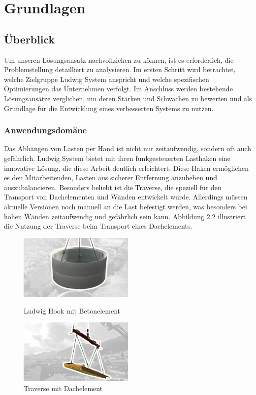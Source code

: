 \section{Grundlagen}

\subsection{Überblick}
Um unseren Lösungsansatz nachvollziehen zu können, ist es erforderlich, 
die Problemstellung detailliert zu analysieren. Im ersten Schritt wird betrachtet, 
welche Zielgruppe Ludwig System anspricht und welche spezifischen Optimierungen 
das Unternehmen verfolgt. Im Anschluss werden bestehende Lösungsansätze verglichen, 
um deren Stärken und Schwächen zu bewerten und als Grundlage 
für die Entwicklung eines verbesserten Systems zu nutzen.



\subsubsection{Anwendungsdomäne}
Das Abhängen von Lasten per Hand ist nicht nur zeitaufwendig, sondern oft auch gefährlich. 
Ludwig System bietet mit ihren funkgesteuerten Lasthaken eine innovative Lösung, 
die diese Arbeit deutlich erleichtert. Diese Haken ermöglichen es den Mitarbeitenden, 
Lasten aus sicherer Entfernung anzuheben und auszubalancieren. Besonders beliebt ist 
die Traverse, die speziell für den Transport von Dachelementen und Wänden entwickelt wurde. 
Allerdings müssen aktuelle Versionen noch manuell an die Last befestigt werden, 
was besonders bei hohen Wänden zeitaufwendig und gefährlich sein kann. 
Abbildung 2.2 illustriert die Nutzung der Traverse beim Transport eines Dachelements.


\begin{figure}[H]
    \centering
    \includegraphics[width=0.5\textwidth]{graphics/Betonelement.jpg}\hfill%
    \caption{Ludwig Hook mit Betonelement}
    \centering
    \includegraphics[width=0.5\textwidth]{graphics/Traverse.jpg}
    \caption{Traverse mit Dachelement}
\end{figure}

